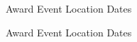 \begin{cvhonors}

  \cvhonor
    {Award} %
    {Event} %
    {Location} %
    {Dates} %

  \cvhonor
    {Award} %
    {Event} %
    {Location} %
    {Dates} %

\end{cvhonors}
